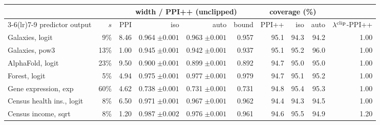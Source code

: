 \begin{tabular}{l r rrrr rrr r}
\toprule
 & & \multicolumn{4}{c}{width / PPI++ (unclipped)} & \multicolumn{3}{c}{coverage (\%)} & \\
\cmidrule(lr){3-6}\cmidrule(lr){7-9}
predictor output & $s$ & PPI & iso & auto & bound & PPI++ & iso & auto & $\lambda^{\rm clip}$-PPI++\\
\midrule
Galaxies, logit & 9\% & 8.46 & 0.964$\;{\scriptstyle\pm0.001}$ & 0.963$\;{\scriptstyle\pm0.001}$ & 0.957 & 95.1 & 94.3 & 94.2 & 1.00\\
Galaxies, pow3 & 13\% & 1.00 & 0.945$\;{\scriptstyle\pm0.001}$ & 0.942$\;{\scriptstyle\pm0.001}$ & 0.937 & 95.1 & 95.2 & 96.0 & 1.00\\
AlphaFold, logit & 23\% & 9.50 & 0.900$\;{\scriptstyle\pm0.001}$ & 0.899$\;{\scriptstyle\pm0.001}$ & 0.892 & 94.7 & 95.0 & 95.0 & 1.00\\
Forest, logit & 5\% & 4.94 & 0.975$\;{\scriptstyle\pm0.001}$ & 0.977$\;{\scriptstyle\pm0.001}$ & 0.979 & 94.7 & 95.1 & 95.2 & 1.00\\
Gene expression, exp & 60\% & 4.62 & 0.738$\;{\scriptstyle\pm0.001}$ & 0.731$\;{\scriptstyle\pm0.001}$ & 0.731 & 94.8 & 95.4 & 95.3 & 1.00\\
Census health ins., logit & 8\% & 6.50 & 0.971$\;{\scriptstyle\pm0.001}$ & 0.967$\;{\scriptstyle\pm0.001}$ & 0.962 & 94.4 & 94.3 & 94.5 & 1.00\\
Census income, sqrt & 8\% & 1.20 & 0.987$\;{\scriptstyle\pm0.002}$ & 0.976$\;{\scriptstyle\pm0.001}$ & 0.961 & 94.6 & 95.5 & 94.9 & 1.20\\
\bottomrule
\end{tabular}
